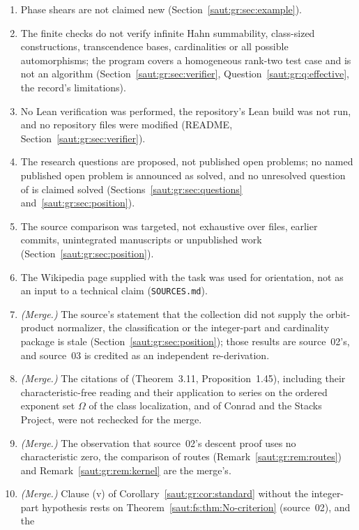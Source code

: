 \documentclass[11pt]{article}
\theoremstyle{definition}
\theoremstyle{remark}
\numberwithin{equation}{section}
\begin{document}
\begin{enumerate}[label=\arabic*.,leftmargin=2.2em]
counting uses set-indexed representatives (Section~\ref{saut:gr:sec:inverse}).
\item Phase shears are not claimed new (Section~\ref{saut:gr:sec:example}).
\item The finite checks do not verify infinite Hahn summability, class-sized constructions,
transcendence bases, cardinalities or all possible automorphisms; the program covers a
homogeneous rank-two test case and is not an algorithm (Section~\ref{saut:gr:sec:verifier},
Question~\ref{saut:gr:q:effective}, the record's limitations).
\item No Lean verification was performed, the repository's Lean build was not run, and no
repository files were modified (README, Section~\ref{saut:gr:sec:verifier}).
\item The research questions are proposed, not published open problems; no named published
open problem is announced as solved, and no unresolved question of \cite{KKS} is claimed
solved (Sections~\ref{saut:gr:sec:questions} and~\ref{saut:gr:sec:position}).
\item The source comparison was targeted, not exhaustive over files, earlier commits,
unintegrated manuscripts or unpublished work (Section~\ref{saut:gr:sec:position}).
\item The Wikipedia page supplied with the task was used for orientation, not as an input to a
technical claim (\texttt{SOURCES.md}).
\item \emph{(Merge.)} The source's statement that the collection did not supply the
orbit-product normalizer, the classification or the integer-part and cardinality package is
stale (Section~\ref{saut:gr:sec:position}); those results are source~02's, and source~03 is
credited as an independent re-derivation.
\item \emph{(Merge.)} The citations of \cite{BKKS} (Theorem~3.11, Proposition~1.45),
including their characteristic-free reading and their application to series on the ordered
exponent set $\Omega$ of the class localization, and of Conrad and the Stacks Project, were
not rechecked for the merge.
\item \emph{(Merge.)} The observation that source~02's descent proof uses no characteristic
zero, the comparison of routes (Remark~\ref{saut:gr:rem:routes}) and
Remark~\ref{saut:gr:rem:kernel} are the merge's.
\item \emph{(Merge.)} Clause (v) of Corollary~\ref{saut:gr:cor:standard} without the
integer-part hypothesis rests on Theorem~\ref{saut:fs:thm:No-criterion} (source~02), and the

\end{enumerate}
\end{document}
